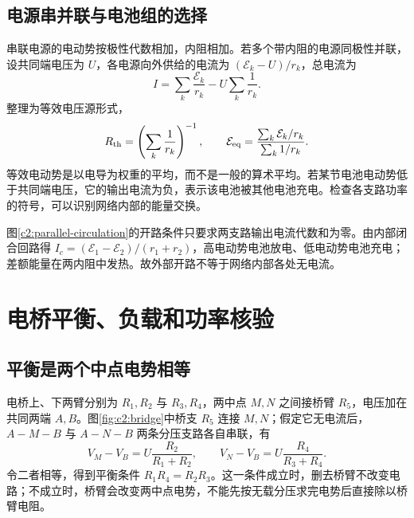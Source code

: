\subsection{电源串并联与电池组的选择}

串联电源的电动势按极性代数相加，内阻相加。若多个带内阻的电源同极性并联，设共同端电压为 $U$，各电源向外供给的电流为 $(\mathcal E_k-U)/r_k$，总电流为
\[
 I=\sum_k\frac{\mathcal E_k}{r_k}-U\sum_k\frac1{r_k}.
\]
整理为等效电压源形式，
\[
 R_{\rm th}=\left(\sum_k\frac1{r_k}\right)^{-1},\qquad
 \mathcal E_{\rm eq}=\frac{\sum_k\mathcal E_k/r_k}{\sum_k1/r_k}.
\]
等效电动势是以电导为权重的平均，而不是一般的算术平均。若某节电池电动势低于共同端电压，它的输出电流为负，表示该电池被其他电池充电。检查各支路功率的符号，可以识别网络内部的能量交换。


图\ref{c2:parallel-circulation}的开路条件只要求两支路输出电流代数和为零。由内部闭合回路得 $I_c=(\mathcal E_1-\mathcal E_2)/(r_1+r_2)$，高电动势电池放电、低电动势电池充电；差额能量在两内阻中发热。故外部开路不等于网络内部各处无电流。

\section{电桥平衡、负载和功率核验}
\subsection{平衡是两个中点电势相等}

电桥上、下两臂分别为 $R_1,R_2$ 与 $R_3,R_4$，两中点 $M,N$ 之间接桥臂 $R_5$，电压加在共同两端 $A,B$。图\ref{fig:c2:bridge}中桥支 $R_5$ 连接 $M,N$；假定它无电流后，$A-M-B$ 与 $A-N-B$ 两条分压支路各自串联，有
\[
 V_M-V_B=U\frac{R_2}{R_1+R_2},\qquad
 V_N-V_B=U\frac{R_4}{R_3+R_4}.
\]
令二者相等，得到平衡条件 $R_1R_4=R_2R_3$。这一条件成立时，删去桥臂不改变电路；不成立时，桥臂会改变两中点电势，不能先按无载分压求完电势后直接除以桥臂电阻。

